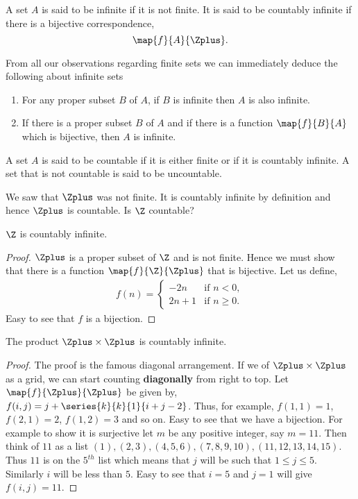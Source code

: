 \begin{Definition}[name=Infinite and Countably infinite]
    A set $A$ is said to be infinite if it is not finite. It is said to be countably infinite if there is a
    bijective correspondence,
    \[\map{f}{A}{\Zplus}.\]
\end{Definition}
From all our observations regarding finite sets we can immediately deduce the following about infinite sets
\begin{enumerate}
    \item
	For any proper subset $B$ of $A$, if $B$ is infinite then $A$ is also infinite.
    \item
	If there is a proper subset $B$ of $A$ and if there is a function $\map{f}{B}{A}$ which is bijective,
	then $A$ is infinite.
\end{enumerate}
\begin{Definition}[name=Countable]
    A set $A$ is said to be countable if it is either finite or if it is countably infinite. A set that is not
    countable is said to be uncountable.
\end{Definition}
We saw that $\Zplus$ was not finite. It is countably infinite by definition and hence $\Zplus$ is countable.
Is $\Z$ countable?
\begin{Proposition}
    $\Z$ is countably infinite.
\end{Proposition}
\begin{proof}
    $\Zplus$ is a proper subset of $\Z$ and is not finite. Hence we must show that there is a function
    $\map{f}{\Z}{\Zplus}$ that is bijective. Let us define,
    \begin{align*}
	f(n) = 
	\begin{cases}
	    -2n &\text{if $n < 0$},\\
	    2n + 1 &\text{if $n \geq 0$}.
	\end{cases}
    \end{align*}
    Easy to see that $f$ is a bijection.
\end{proof}
\begin{Proposition}
    The product $\Zplus \times \Zplus$ is countably infinite.
\end{Proposition}
\begin{proof}
    The proof is the famous diagonal arrangement. If we of $\Zplus \times \Zplus$ as a grid, we can start
    counting \textbf{diagonally} from right to top. Let $\map{f}{\Zplus}{\Zplus}$ be given by,
    $f(i,j) = j + \series{k}{k}{1}{i+j-2}$. Thus, for example, $f(1,1) = 1$, $f(2,1) = 2$, $f(1,2) = 3$ and so
    on. Easy to see that we have a bijection. For example to show it is surjective let $m$ be any positive
    integer, say $m = 11$. Then think of $11$ as a list $(1),(2,3),(4,5,6),(7,8,9,10),(11,12,13,14,15)$. Thus
    $11$ is on the $5^{th}$ list which means that $j$ will be such that $1\leq j \leq 5$. Similarly $i$ will
    be less than $5$. Easy to see that $i = 5$ and $j = 1$ will give $f(i,j) = 11$.
\end{proof}
